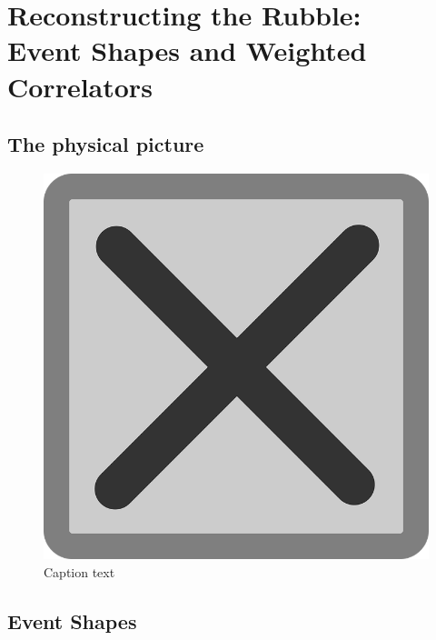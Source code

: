 \chapter{Reconstructing the Rubble:\\Event Shapes and Weighted Correlators}

\section{The physical picture}

\begin{figure}[t!]
    \centering
    \includegraphics[width=\textwidth]{figures/tempfig}

    \caption{
        Caption text
    }

    \label{fig:label}
\end{figure}

\section{Event Shapes}

